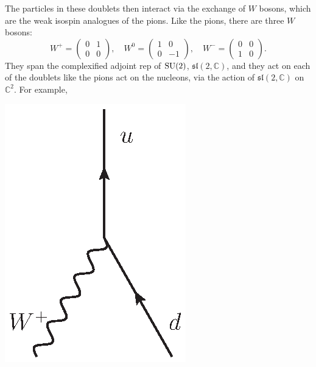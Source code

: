 \documentclass{article}
\newcommand{\C}{{\mathbb C}}  %
\newcommand{\SU}{{\rm SU}}    %
\renewcommand{\sl}{\mathfrak{sl}} %
\begin{document}
The particles in these doublets then interact via the exchange of $W$ bosons,
which are the weak isospin analogues of the pions. Like the pions, there are
three $W$ bosons:
\[ W^+ = \left(\begin{array}{cc} 0 & 1 \\ 0 & 0 \end{array} \right), \quad  
W^0 = \left(\begin{array}{cc} 1 & 0 \\ 0 & -1 \end{array} \right), \quad
W^- = \left(\begin{array}{cc} 0 & 0 \\ 1 & 0 \end{array} \right). \]
They span the complexified adjoint rep of $\SU(2)$, $\sl(2, \C)$, and they act
on each of the doublets like the pions act on the nucleons, via the action of
$\sl(2,\C)$ on $\C^2$. For example,
\begin{center}
	\includegraphics[scale=0.75]{W+d_vertex}
\end{center}
\end{document}
